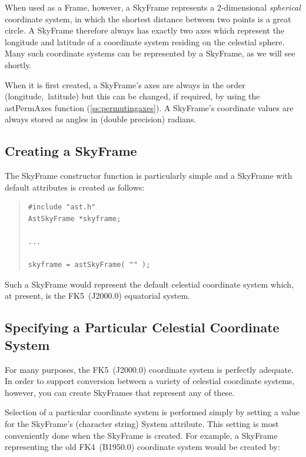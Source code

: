 \documentclass[twoside,11pt]{article}
\newcommand{\htmlref}[2]{#1}
\newcommand{\secref}[1]{\S\ref{#1}}
\renewcommand{\secref}[1]{\ref{#1}}
\begin{document}
When used as a Frame, however, a SkyFrame represents a 2-dimensional
{\em{spherical}} coordinate system, in which the shortest distance
between two points is a great circle.  A SkyFrame therefore always has
exactly two axes which represent the longitude and latitude of a
coordinate system residing on the celestial sphere. Many such
coordinate systems can be represented by a SkyFrame, as we will see
shortly.

When it is first created, a SkyFrame's axes are always in the order
(longitude,~latitude) but this can be changed, if required, by using
the \htmlref{astPermAxes}{astPermAxes} function (\secref{ss:permutingaxes}). A SkyFrame's
coordinate values are always stored as angles in (double precision)
radians.

\subsection{Creating a SkyFrame}

The \htmlref{SkyFrame}{SkyFrame} constructor function is particularly simple and a
SkyFrame with default attributes is created as follows:

\begin{quote}
\small
\begin{verbatim}
#include "ast.h"
AstSkyFrame *skyframe;

...

skyframe = astSkyFrame( "" );
\end{verbatim}
\normalsize
\end{quote}

Such a SkyFrame would represent the default celestial coordinate
system which, at present, is the FK5~(J2000.0) equatorial system.

\subsection{Specifying a Particular Celestial Coordinate System}

For many purposes, the FK5~(J2000.0) coordinate system is perfectly
adequate. In order to support conversion between a variety of
celestial coordinate systems, however, you can create SkyFrames that
represent any of these.

Selection of a particular coordinate system is performed simply by
setting a value for the \htmlref{SkyFrame}{SkyFrame}'s (character string) \htmlref{System}{System}
attribute. This setting is most conveniently done when the SkyFrame is
created. For example, a SkyFrame representing the old FK4~(B1950.0)
coordinate system would be created by:
\end{document}
